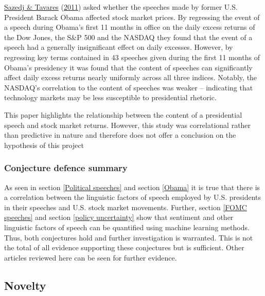 \documentclass[11pt,preprint, authoryear]{elsarticle}
\numberwithin{equation}{section}
\numberwithin{figure}{section}
\numberwithin{table}{section}
\begin{document}
\protect\hyperlink{ref-sazedj2011hope}{Sazedj \& Tavares}
(\protect\hyperlink{ref-sazedj2011hope}{2011}) asked whether the
speeches made by former U.S. President Barack Obama affected stock
market prices. By regressing the event of a speech during Obama's first
11 months in office on the daily excess returns of the Dow Jones, the
S\&P 500 and the NASDAQ they found that the event of a speech had a
generally insignificant effect on daily excesses. However, by regressing
key terms contained in 43 speeches given during the first 11 months of
Obama's presidency it was found that the content of speeches can
significantly affect daily excess returns nearly uniformly across all
three indices. Notably, the NASDAQ's correlation to the content of
speeches was weaker -- indicating that technology markets may be less
susceptible to presidential rhetoric.

This paper highlights the relationship between the content of a
presidential speech and stock market returns. However, this study was
correlational rather than predictive in nature and therefore does not
offer a conclusion on the hypothesis of this project

\hypertarget{conjecture-defence-summary}{%
\subsubsection{\texorpdfstring{Conjecture defence summary
\label{defence summary}}{Conjecture defence summary }}\label{conjecture-defence-summary}}

As seen in section \ref{Political speeches} and section \ref{Obama} it
is true that there is a correlation between the linguistic factors of
speech employed by U.S. presidents in their speeches and U.S. stock
market movements. Further, section \ref{FOMC speeches} and section
\ref{policy uncertainty} show that sentiment and other linguistic
factors of speech can be quantified using machine learning methods.
Thus, both conjectures hold and further investigation is warranted. This
is not the total of all evidence supporting these conjectures but is
sufficient. Other articles reviewed here can be seen for further
evidence.

\hypertarget{novelty}{%
\subsection{\texorpdfstring{Novelty
\label{novelty}}{Novelty }}\label{novelty}}
\end{document}
